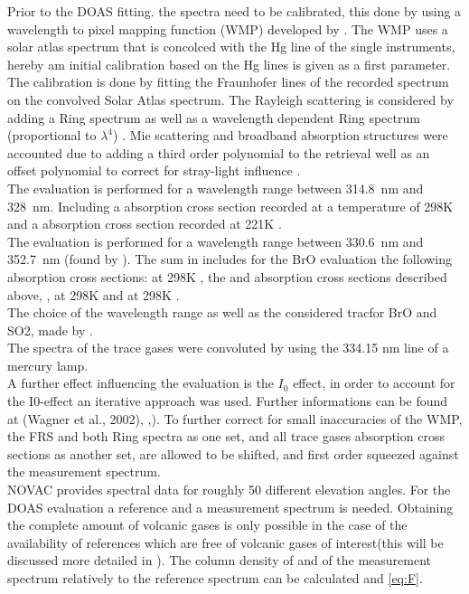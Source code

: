 Prior to the DOAS fitting. the spectra need to be calibrated, this done by using a wavelength to pixel mapping function (WMP) developed by \citet{lehman 2014}. The WMP uses a solar atlas spectrum that is concolced with the Hg line of the single instruments, hereby am initial calibration based on the Hg lines is given as a first parameter. The calibration is done by fitting the Fraunhofer lines of the recorded spectrum on the convolved Solar Atlas spectrum. The Rayleigh scattering is considered by adding a Ring spectrum as well as a wavelength dependent Ring spectrum (proportional to $\lambda^4$) \citep{wagner2009}. Mie scattering and broadband absorption structures were accounted due to adding a third order polynomial to the retrieval well as an offset polynomial to correct for stray-light influence \citep{lubcke2014bro}.\\
The  evaluation is performed for a wavelength range between 314.8~nm and 328~nm. Including a  absorption cross section recorded at a temperature of 298K \citep{vandaele2009fourier} and a   absorption cross section recorded at 221K \citep{burrows1999atmospheric}.\\
The   evaluation is performed for a wavelength range between 330.6~nm and 352.7~nm (found by \citet{vogel2011volcanic}). The sum in  includes for the BrO evaluation the following absorption cross sections:
  at 298K \citep{fleischmann2004new}, the  and   absorption cross sections described above,  \citep{hermans2003absorption},   at 298K \citep{vandaele1998measurements} and   at 298K \citep{meller2000temperature}.\\
%
The choice of the wavelength range as well as the considered tracfor BrO and SO2, made by \citet{vogel2011volcanic}.\\
The spectra of the trace gases were convoluted by using the 334.15 nm line of a mercury lamp.\\
A further effect influencing the evaluation is the $I_{0}$ effect, in order to account for the I0-effect \citep{platt2008differential} an
iterative approach was used. Further informations can be found at (Wagner et al., 2002), \cite{lubcke2014bro},\cite{vogel2011volcanic}).
To further correct for small inaccuracies of the WMP, the FRS and both Ring spectra as one set, and all trace gases absorption cross sections as another set, are allowed to be shifted, and first order squeezed against the measurement spectrum.\\
%
NOVAC provides spectral data for roughly 50 different elevation angles. For the DOAS evaluation a reference and a measurement spectrum is needed. Obtaining the complete amount of volcanic gases is only possible in the case of the availability of references which are free of volcanic gases of interest(this will be discussed more detailed in ). The column density of    and  of the measurement spectrum relatively to the reference spectrum can be calculated  and \ref{eq:F}. \\
